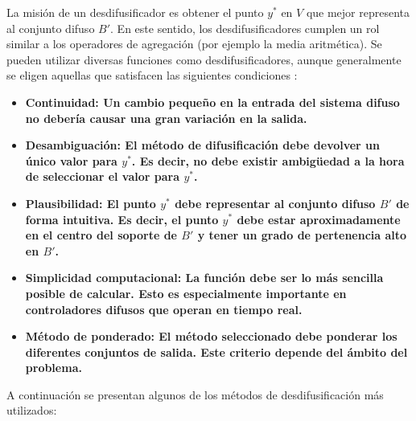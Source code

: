 La misión de un desdifusificador es obtener el punto $y^*$ en $V$ que mejor representa al conjunto difuso $B'$. En este sentido, los desdifusificadores cumplen un rol similar a los operadores de agregación (por ejemplo la media aritmética). Se pueden utilizar diversas funciones como desdifusificadores, aunque generalmente se eligen aquellas que satisfacen las siguientes condiciones \cite{hellendoorn93}:

\begin{itemize}
\item\bfseries Continuidad: \normalfont Un cambio pequeño en la entrada del sistema difuso no debería causar una gran variación en la salida.
\item\bfseries Desambiguación: \normalfont El método de difusificación debe devolver un único valor para $y^*$. Es decir, no debe existir ambigüedad a la hora de seleccionar el valor para $y^*$.
\item\bfseries Plausibilidad: \normalfont El punto $y^*$ debe representar al conjunto difuso $B'$ de forma intuitiva. Es decir, el punto $y^*$ debe estar aproximadamente en el centro del soporte de $B'$ y tener un grado de pertenencia alto en $B'$.
\item\bfseries Simplicidad computacional: \normalfont La función debe ser lo más sencilla posible de calcular. Esto es especialmente importante en controladores difusos que operan en tiempo real.
\item\bfseries Método de ponderado: \normalfont El método seleccionado debe ponderar los diferentes conjuntos de salida. Este criterio depende del ámbito del problema.
\end{itemize}
A continuación se presentan algunos de los métodos de desdifusificación más utilizados:

